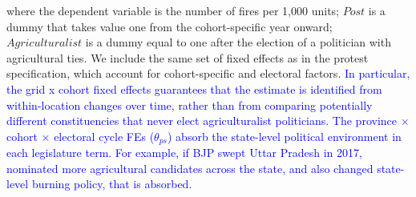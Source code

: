 \documentclass[12pt]{article}
\begin{document}
where the dependent variable is the number of fires per 1,000 units; $Post$ is a dummy that takes value one from the cohort-specific year onward; $Agriculturalist$ is a dummy equal to one after the election of a politician with agricultural ties. We include the same set of fixed effects as in the protest specification, which account for cohort-specific and electoral factors. \textcolor{blue}{In particular, the grid x cohort fixed effects guarantees that the estimate is identified from within-location changes over time, rather than from comparing potentially different constituencies that never elect agriculturalist politicians. The province × cohort × electoral cycle FEs ($\theta_{ps}$) absorb the state-level political environment in each legislature term. For example, if BJP swept Uttar Pradesh in 2017, nominated more agricultural candidates across the state, and also changed state-level burning policy, that is absorbed. 
}
\end{document}
